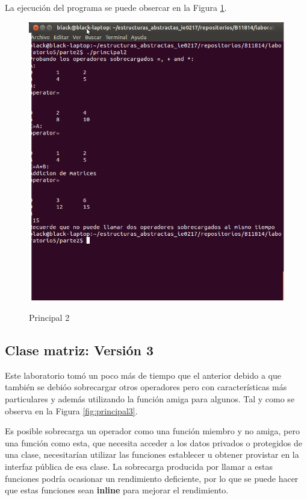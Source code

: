 \documentclass{article}
\begin{document}
La ejecuci\' on del programa se puede obsercar en la Figura \ref{fig:principal2}.

\begin{figure}[hbtp]
\caption{Principal 2}
\includegraphics[scale=0.4]{./imagenes/principal2.png}
\label{fig:principal2}
\end{figure}


\subsection{Clase matriz: Versi\' on 3}
Este laboratorio tom\' o un poco m\' as de tiempo que el anterior debido a que tambi\' en se debi\' oo sobrecargar otros operadores pero con caracter\' isticas m\' as particulares y adem\' as utilizando la funci\' on amiga para algunos. Tal y como se observa en la Figura \ref{fig:principal3}.

Es posible sobrecarga un operador como una funci\' on miembro y no amiga, pero una funci\' on como esta, que necesita acceder a los datos privados o protegidos de una clase, necesitar\' ian utilizar las funciones establecer u obtener provistar en la interfaz p\' ublica de esa clase. La sobrecarga producida por llamar a estas funciones podr\' ia ocasionar un rendimiento deficiente, por lo que se puede hacer que estas funciones sean \textbf{inline}  para mejorar el rendimiento.
\end{document}
